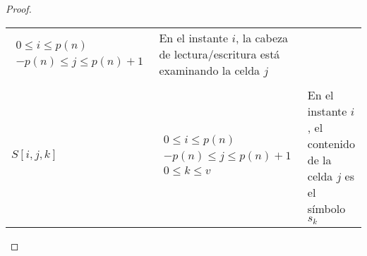 \documentclass[11pt, a4paper]{memoir}
\begin{document}
\begin{proof}
\begin{table}[!ht]
\begin{center}
{\begin{tabular}{@{}C{.15\textwidth}C{.25\textwidth}L{.45\textwidth}@{}}
  \begin{minipage}{.24\textwidth} %
  \centering
    \begin{math} %
      \begin{array}{c} %
          0 \le i\le p(n) \\ %
          -p(n) \le j \le p(n) + 1 %
        \end{array}%
    \end{math} %
  \end{minipage} & En el instante $i$, la cabeza de lectura/escritura está examinando la celda $j$\\ \\ 
$S[i,j,k]$       & 

  \begin{minipage}{.24\textwidth} %
  \centering
    \begin{math} %
      \begin{array}{c} %
          0 \le i\le p(n) \\ %
           -p(n) \le j \le p(n) + 1 \\ %
           0 \le k \le v 
        \end{array}%
    \end{math} %
  \end{minipage} & En el instante $i$, el contenido de la celda $j$ es el símbolo $s_k$\\ 
\bottomrule
			\end{tabular}
		}
	\end{center}
\end{table}
\end{proof}



\clearpage
\printglossary[type=\acronymtype]
\end{document}
